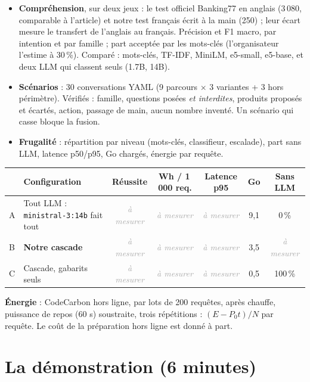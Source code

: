 \documentclass[11pt,a4paper]{article}
\DeclareRobustCommand{\f}[1]{{\texttt{\small
  \renewcommand{\_}{\char`\_\allowbreak}#1}}}
\newcommand{\amesurer}{\textit{\textcolor{darkgray}{à mesurer}}}
\begin{document}
\begin{itemize}
  \item \textbf{Compréhension}, sur deux jeux : le test officiel Banking77 en anglais (3\,080,
        comparable à l'article) et notre test français écrit à la main (250) ; leur écart mesure le
        transfert de l'anglais au français. Précision et F1 macro, par intention et par famille ;
        part acceptée par les mots-clés (l'organisateur l'estime à 30\,\%). Comparé : mots-clés,
        TF-IDF, MiniLM, e5-small, e5-base, et deux LLM qui classent seuls (1.7B, 14B).
  \item \textbf{Scénarios} : 30 conversations YAML (9 parcours $\times$ 3 variantes + 3 hors
        périmètre). Vérifiés : famille, questions posées \emph{et interdites}, produits proposés et
        écartés, action, passage de main, aucun nombre inventé. Un scénario qui casse bloque la
        fusion.
  \item \textbf{Frugalité} : répartition par niveau (mots-clés, classifieur, escalade), part sans
        LLM, latence p50/p95, Go chargés, énergie par requête.
\end{itemize}

\begin{center}\small
\begin{tabular}{@{}l l c c c c c@{}}
\toprule
& \textbf{Configuration} & \textbf{Réussite} & \textbf{Wh / 1\,000 req.} & \textbf{Latence p95} &
  \textbf{Go} & \textbf{Sans LLM} \\
\midrule
A & Tout LLM : \f{ministral-3:14b} fait tout & \amesurer & \amesurer & \amesurer & 9,1 & 0\,\% \\
B & \textbf{Notre cascade} & \amesurer & \amesurer & \amesurer & 3,5 & \amesurer \\
C & Cascade, gabarits seuls & \amesurer & \amesurer & \amesurer & 0,5 & 100\,\% \\
\bottomrule
\end{tabular}
\end{center}

\textbf{Énergie} : CodeCarbon hors ligne, par lots de 200 requêtes, après chauffe, puissance de
repos (60 s) soustraite, trois répétitions : $(E - P_0 t)/N$ par requête. Le coût de la préparation
hors ligne est donné à part.

\section{La démonstration (6 minutes)}
\end{document}
